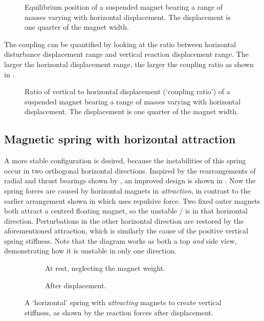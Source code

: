 \documentclass[11pt,a4paper]{memoir}
\begin{document}
\begin{figure}
  \caption{Equilibrium position of a suspended magnet bearing a range of
  masses varying with horizontal displacement.
  The displacement is one quarter of the magnet width.}
\end{figure}

The coupling can be quantified by looking at the ratio between horizontal
disturbance displacement range and vertical reaction displacement range. The
larger the horizontal displacement range, the larger the coupling ratio as
shown in .

\begin{figure}
  \caption{Ratio of vertical to horizontal displacement (`coupling ratio') of
  a suspended magnet bearing a range of masses varying with horizontal
  displacement. The displacement is one quarter of the magnet width.}
\end{figure}





\subsection{Magnetic spring with horizontal attraction}

A more stable configuration is desired, because the instabilities of this spring occur in two orthogonal horizontal directions.
Inspired by the rearrangements of radial and thrust bearings shown by \textcite{yonnet1981}, an improved design is shown in .
Now the spring forces are caused by horizontal magnets in \emph{attraction}, in contrast to the earlier arrangement shown in  which uses repulsive force.
Two fixed outer magnets both attract a centred floating magnet, so the unstable \dof/ is in that horizontal direction.
Perturbations in the other horizontal direction are restored by the aforementioned attraction, which is similarly the cause of the positive vertical spring stiffness.
Note that the diagram works as both a top \emph{and} side view, demonstrating how it is unstable in only one direction.

\begin{figure}
  \begin{subfigure}
    \caption{At rest, neglecting the magnet weight.}
  \end{subfigure}
  \hfil
  \begin{subfigure}
    \caption{After displacement.}
  \end{subfigure}
  \caption[`Horizontal' spring.]{A `horizontal' spring with \emph{attracting}
magnets to create vertical stiffness, as shown by the reaction forces after
displacement.}
\end{figure}
\end{document}
